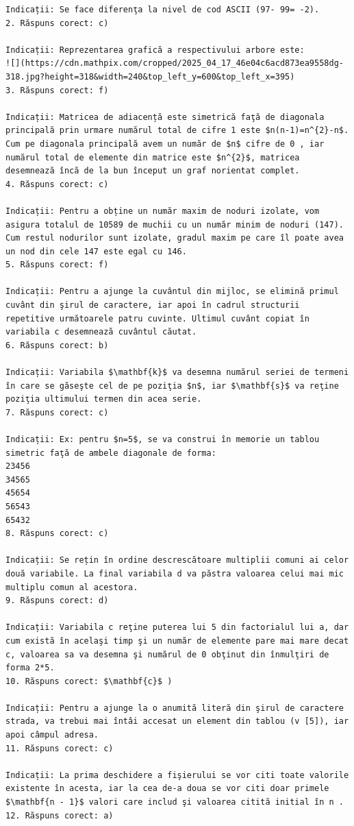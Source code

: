 \documentclass[10pt]{article}
\begin{document}
\begin{verbatim}
Indicații: Se face diferenţa la nivel de cod ASCII (97- 99= -2).
2. Răspuns corect: c)

Indicații: Reprezentarea grafică a respectivului arbore este:
![](https://cdn.mathpix.com/cropped/2025_04_17_46e04c6acd873ea9558dg-318.jpg?height=318&width=240&top_left_y=600&top_left_x=395)
3. Răspuns corect: f)

Indicații: Matricea de adiacență este simetrică faţă de diagonala principală prin urmare numărul total de cifre 1 este $n(n-1)=n^{2}-n$. Cum pe diagonala principală avem un număr de $n$ cifre de 0 , iar numărul total de elemente din matrice este $n^{2}$, matricea desemnează încă de la bun început un graf norientat complet.
4. Răspuns corect: c)

Indicații: Pentru a obține un număr maxim de noduri izolate, vom asigura totalul de 10589 de muchii cu un număr minim de noduri (147). Cum restul nodurilor sunt izolate, gradul maxim pe care îl poate avea un nod din cele 147 este egal cu 146.
5. Răspuns corect: f)

Indicații: Pentru a ajunge la cuvântul din mijloc, se elimină primul cuvânt din şirul de caractere, iar apoi în cadrul structurii repetitive următoarele patru cuvinte. Ultimul cuvânt copiat în variabila c desemnează cuvântul căutat.
6. Răspuns corect: b)

Indicații: Variabila $\mathbf{k}$ va desemna numărul seriei de termeni în care se găseşte cel de pe poziţia $n$, iar $\mathbf{s}$ va reţine poziţia ultimului termen din acea serie.
7. Răspuns corect: c)

Indicații: Ex: pentru $n=5$, se va construi în memorie un tablou simetric faţă de ambele diagonale de forma:
23456
34565
45654
56543
65432
8. Răspuns corect: c)

Indicații: Se rețin în ordine descrescătoare multiplii comuni ai celor două variabile. La final variabila d va păstra valoarea celui mai mic multiplu comun al acestora.
9. Răspuns corect: d)

Indicații: Variabila c reţine puterea lui 5 din factorialul lui a, dar cum există în acelaşi timp şi un număr de elemente pare mai mare decat c, valoarea sa va desemna şi numărul de 0 obţinut din înmulţiri de forma 2*5.
10. Răspuns corect: $\mathbf{c}$ )

Indicații: Pentru a ajunge la o anumită literă din şirul de caractere strada, va trebui mai întâi accesat un element din tablou (v [5]), iar apoi câmpul adresa.
11. Răspuns corect: c)

Indicații: La prima deschidere a fişierului se vor citi toate valorile existente în acesta, iar la cea de-a doua se vor citi doar primele $\mathbf{n - 1}$ valori care includ şi valoarea citită initial în n .
12. Răspuns corect: a)


\end{verbatim}
\end{document}

